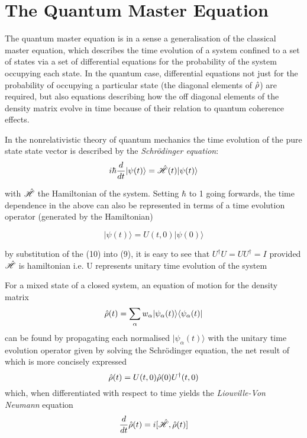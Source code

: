 \section{The Quantum Master Equation}
The quantum master equation is in a sense a generalisation of the classical master equation, which describes the time evolution of a system confined to a set of states via a set of differential equations for the probability of the system occupying each state. In the quantum case, differential equations not just for the probability of occupying a particular state (the diagonal elements of $\hat{\rho}$) are required, but also equations describing how the off diagonal elements of the density matrix evolve in time because of their relation to quantum coherence effects.

In the nonrelativistic theory of quantum mechanics the time evolution of the pure state state vector is described by the \emph{Schr\"odinger equation}:
\begin{equation}
	i\hbar \frac{d}{dt} |\psi(t)\rangle = \hat{\mathscr{H}}(t) |\psi(t) \rangle
\end{equation}

with $\hat{\mathscr{H}}$ the Hamiltonian of the system. Setting $\hbar$ to 1 going forwards, the time dependence in the above can also be represented in terms of a time evolution operator (generated by the Hamiltonian) 

\begin{equation}
	|\psi(t) \rangle = U(t, 0) | \psi(0) \rangle
\end{equation}

by substitution of the (10) into (9), it is easy to see that $U^{\dagger}U = UU^\dagger = I$ provided $\hat{\mathscr{H}}$ is hamiltonian i.e. U represents unitary time evolution of the system

For a mixed state of a closed system, an equation of motion for the density matrix
\begin{equation}
	\hat{\rho} (t) = \sum_\alpha w_{\alpha} |\psi_\alpha (t) \rangle \langle \psi_\alpha (t) |
\end{equation}
can be found by propagating each normalised $| \psi_\alpha (t) \rangle$ with the unitary time evolution operator given by solving the Schr\"odinger equation, the net result of which is more concisely expressed
\begin{equation}
	\hat{\rho} (t) = U(t, 0)\hat{\rho} (0) U^\dagger (t, 0)
\end{equation}
which, when differentiated with respect to time yields the \emph{Liouville-Von Neumann} equation
\begin{equation}
	\frac{d}{dt}\hat{\rho}(t) = i [\hat{\mathscr{H}}, \hat{\rho} (t) ]
\end{equation}

